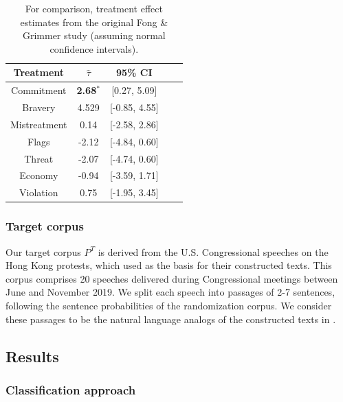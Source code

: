 \documentclass{article}
\begin{document}
\begin{table}[!ht]
    \centering
    \begin{tabular}{c|cccc}
        \toprule
        Treatment & $\hat{\tau}$ & 95\% CI \\
        \midrule
        Commitment & \textbf{\textcolor{green!50!black}{2.68$^*$}} & [0.27, 5.09] \\
        Bravery & \textcolor{green!50!black}{4.529} & [-0.85, 4.55] \\
        Mistreatment & \textcolor{green!50!black}{0.14} & [-2.58, 2.86] \\
        Flags & \textcolor{red!80!black}{-2.12} & [-4.84, 0.60] \\
        Threat & \textcolor{red!80!black}{-2.07} & [-4.74, 0.60]  \\
        Economy & \textcolor{red!80!black}{-0.94} & [-3.59, 1.71] \\
        Violation & \textcolor{green!50!black}{0.75} & [-1.95, 3.45] \\
        \bottomrule
    \end{tabular}
    \caption{For comparison, treatment effect estimates from the original Fong \& Grimmer study \cite{fong2021causal} (assuming normal confidence intervals).}
    \label{tab:results_baseline}
\end{table}

\subsubsection{Target corpus}

Our target corpus $P^T$ is derived from the U.S. Congressional speeches on the Hong Kong protests, which \cite{fong2021causal} used as the basis for their constructed texts. This corpus comprises 20 speeches delivered during Congressional meetings between June and November 2019. We split each speech into passages of 2-7 sentences, following the sentence probabilities of the randomization corpus. We consider these passages to be the natural language analogs of the constructed texts in \cite{fong2021causal}.

\subsection{Results}

\subsubsection{Classification approach}
\end{document}

